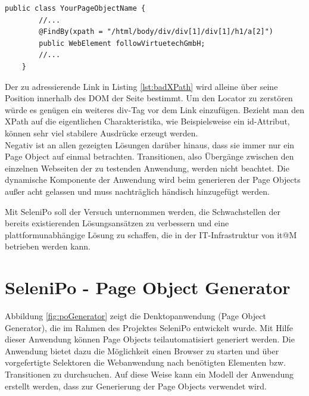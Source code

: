 \begin{lstlisting}[caption={Einfacher XPath-Locator des Projektes OHMAP},label={lst:badXPath}]
	public class YourPageObjectName {
		//...		
 		@FindBy(xpath = "/html/body/div/div[1]/div[1]/h1/a[2]")
		public WebElement followVirtuetechGmbH;	
		//...
	}
\end{lstlisting}

Der zu adressierende Link in Listing \ref{lst:badXPath} wird alleine über seine Position innerhalb des DOM der Seite bestimmt.
Um den Locator zu zerstören würde es genügen ein weiteres div-Tag vor dem Link einzufügen. Bezieht man den XPath auf die eigentlichen Charakteristika, wie Beispielsweise ein id-Attribut, können sehr viel stabilere Ausdrücke erzeugt werden.
\\
Negativ ist an allen gezeigten Lösungen darüber hinaus, dass sie immer nur ein Page Object auf einmal betrachten. Transitionen, also Übergänge zwischen den einzelnen Webseiten der zu testenden Anwendung, werden nicht beachtet. Die dynamische Komponente der Anwendung wird beim generieren der Page Objects außer acht gelassen und muss nachträglich händisch hinzugefügt werden.

Mit SeleniPo soll der Versuch unternommen werden, die Schwachstellen der bereits existierenden Lösungsansätzen zu verbessern und eine plattformunabhängige Lösung zu schaffen, die in der IT-Infrastruktur von it@M betrieben werden kann.

\newpage
\section{SeleniPo - Page Object Generator}
\label{sec:selenipo_pogenerator}

Abbildung \ref{fig:poGenerator} zeigt die Denktopanwendung (Page Object Generator), die im Rahmen des Projektes SeleniPo entwickelt wurde. Mit Hilfe dieser Anwendung können Page Objects teilautomatisiert generiert werden. Die Anwendung bietet dazu die Möglichkeit einen Browser zu starten und über vorgefertigte Selektoren die Webanwendung nach benötigten Elementen bzw. Transitionen zu durchsuchen. Auf diese Weise kann ein Modell der Anwendung erstellt werden, dass zur Generierung der Page Objects verwendet wird.

